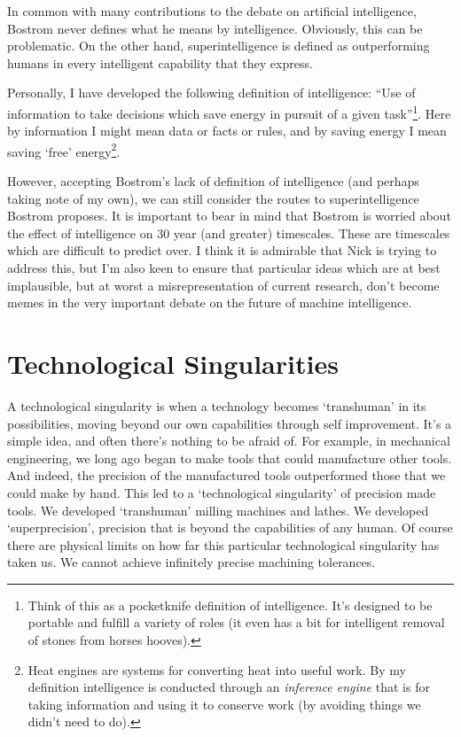 \documentclass[a4paper]{caesar_book}
\begin{document}
In common with many contributions to the debate on artificial intelligence, Bostrom never defines what he means by intelligence. Obviously, this can be problematic. On the other hand, superintelligence is defined as outperforming humans in every intelligent capability that they express.

Personally, I have developed the following definition of intelligence: “Use of information to take decisions which save energy in pursuit of a given task”\footnote{Think of this as a pocketknife definition of intelligence. It’s designed to be portable and fulfill a variety of roles (it even has a bit for intelligent removal of stones from horses hooves).}. Here by information I might mean data or facts or rules, and by saving energy I mean saving ‘free’ energy\footnote{Heat engines are systems for converting heat into useful work. By my definition intelligence is conducted through an \textit{inference engine} that is for taking information and using it to conserve work (by avoiding things we didn't need to do).}.

However, accepting Bostrom’s lack of definition of intelligence (and perhaps taking note of my own), we can still consider the routes to superintelligence Bostrom proposes. It is important to bear in mind that Bostrom is worried about the effect of intelligence on 30 year (and greater) timescales. These are timescales which are difficult to predict over. I think it is admirable that Nick is trying to address this, but I’m also keen to ensure that particular ideas which are at best implausible, but at worst a misrepresentation of current research, don’t become memes in the very important debate on the future of machine intelligence.

\section{Technological Singularities}

A technological singularity is when a technology becomes ‘transhuman’ in its possibilities, moving beyond our own capabilities through self improvement. It’s a simple idea, and often there’s nothing to be afraid of. For example, in mechanical engineering, we long ago began to make tools that could manufacture other tools. And indeed, the precision of the manufactured tools outperformed those that we could make by hand. This led to a ‘technological singularity’ of precision made tools. We developed ‘transhuman’ milling machines and lathes. We developed ‘superprecision’, precision that is beyond the capabilities of any human. Of course there are physical limits on how far this particular technological singularity has taken us. We cannot achieve infinitely precise machining tolerances.
\end{document}
